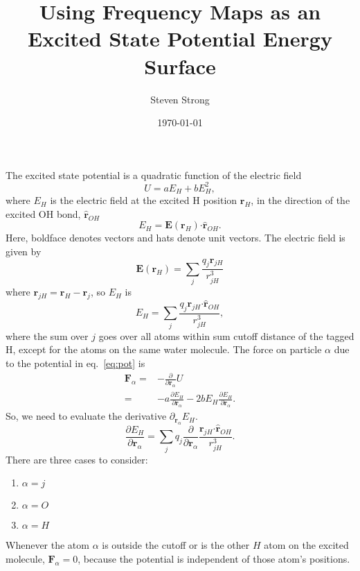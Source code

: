 \documentclass{article}
\newcommand{\vect}[1]{\boldsymbol{\mathbf{#1}}}
\begin{document}
\title{Using Frequency Maps as an Excited State Potential Energy Surface}
\author{Steven Strong}
\date{\today}
\maketitle

The excited state potential is a quadratic function of the electric field
\begin{equation}\label{eq:pot}
U = aE_H+bE_H^2,
\end{equation}
where $E_H$ is the electric field at the excited H position $\vect{r}_H$, in the direction of the excited OH bond, $\vect{\hat r}_{OH}$
\begin{equation}
E_H = \vect E(\vect{r}_H) \vect{\cdot} \vect{\hat r}_{OH}.
\end{equation}
Here, boldface denotes vectors and hats denote unit vectors.
The electric field is given by
\begin{equation}
\vect E(\vect r_H) = \sum_j \frac{q_j\vect{r}_{jH}}{r_{jH}^3}
\end{equation}
where $\vect{r}_{jH} = \vect r_H-\vect r_j$, so $E_H$ is
\begin{equation}
E_H = \sum_j \frac{q_j\vect{r}_{jH}\vect\cdot\vect{\hat r}_{OH} }{r_{jH}^3},
\end{equation}
where the sum over $j$ goes over all atoms within sum cutoff distance of the tagged H, except for the atoms on the same water molecule.
The force on particle $\alpha$ due to the potential in eq.~\ref{eq:pot} is 
\begin{align}
\vect F_\alpha =& -\frac{\partial}{\partial \vect r_\alpha} U \\
=& -a\frac{\partial E_H}{\partial \vect r_\alpha} - 2bE_H\frac{\partial E_H}{\partial \vect r_\alpha} .
\end{align}
So, we need to evaluate the derivative $\partial_{ \vect{r}_\alpha} E_H$.
\begin{equation}\label{eq:ehd}
\frac{\partial E_H}{\partial \vect r_\alpha} = \sum_j q_j \frac{\partial}{\partial \vect r_\alpha} \frac{\vect{r}_{jH}\vect\cdot\vect{\hat r}_{OH} }{r_{jH}^3}.
\end{equation}
There are three cases to consider:
\begin{enumerate}
\item $\alpha=j$
\item $\alpha=O$
\item $\alpha=H$
\end{enumerate}
Whenever the atom $\alpha$ is outside the cutoff or is the other $H$ atom on the excited molecule, $\vect F_\alpha = 0$, because the potential is independent of those atom's positions.
\end{document}
